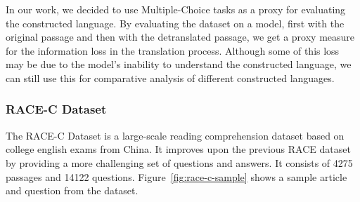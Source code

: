 In our work, we decided to use Multiple-Choice tasks as a proxy for evaluating the constructed language. By evaluating the dataset on a model,
first with the original passage and then with the detranslated passage, we get a proxy measure for the information loss in the translation process.
Although some of this loss may be due to the model's inability to understand the constructed language, we can still use this for comparative 
analysis of different constructed languages.

\subsubsection{RACE-C Dataset}
The RACE-C Dataset \cite{liangNewMultichoiceReading2019} is a large-scale reading comprehension dataset based on college english exams from China.
It improves upon the previous RACE dataset \cite{laiRACELargescaleReAding2017} by providing a more challenging set of questions and answers. 
It consists of 4275 passages and 14122 questions. Figure~\ref{fig:race-c-sample} shows a sample article and question from the dataset.


